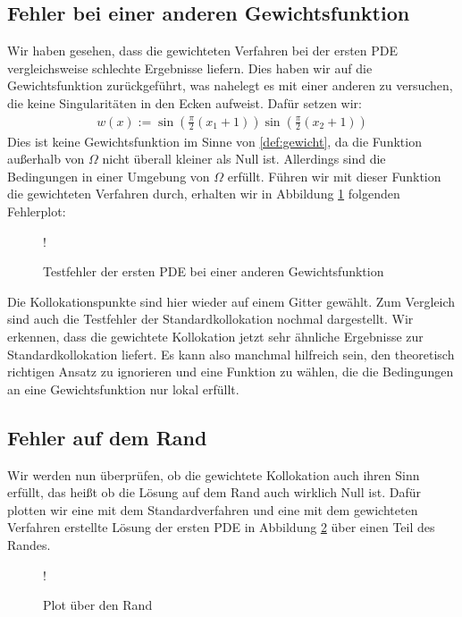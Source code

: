 \subsection{Fehler bei einer anderen Gewichtsfunktion}
\label{sec:andereGewicht}
Wir haben gesehen, dass die gewichteten Verfahren bei der ersten \ac{PDE} vergleichsweise schlechte Ergebnisse liefern. Dies haben wir auf die Gewichtsfunktion zurückgeführt, was nahelegt es mit einer anderen zu versuchen, die keine Singularitäten in den Ecken aufweist. Dafür setzen wir:
\begin{align*}
	w(x) := \sin\left(\frac{\pi}{2}(x_1+1)\right) \sin\left(\frac{\pi}{2}(x_2+1)\right)
\end{align*}
Dies ist keine Gewichtsfunktion im Sinne von \ref{def:gewicht}, da die Funktion außerhalb von $\Omega$ nicht überall kleiner als Null ist. Allerdings sind die Bedingungen in einer Umgebung von $\Omega$ erfüllt. Führen wir mit dieser Funktion die gewichteten Verfahren durch, erhalten wir in Abbildung \ref{fig:andereGewicht} folgenden Fehlerplot:
\begin{figure}[ht]
	\centering
	\resizebox {.85\columnwidth} {!} {
		
	}
	\caption{Testfehler der ersten \acs{PDE} bei einer anderen Gewichtsfunktion}
	\label{fig:andereGewicht}
\end{figure}
Die Kollokationspunkte sind hier wieder auf einem Gitter gewählt. Zum Vergleich sind auch die Testfehler der Standardkollokation nochmal dargestellt. Wir erkennen, dass die gewichtete Kollokation jetzt sehr ähnliche Ergebnisse zur Standardkollokation liefert. Es kann also manchmal hilfreich sein, den theoretisch richtigen Ansatz zu ignorieren und eine Funktion zu wählen, die die Bedingungen an eine Gewichtsfunktion nur lokal erfüllt.

\subsection{Fehler auf dem Rand}
Wir werden nun überprüfen, ob die gewichtete Kollokation auch ihren Sinn erfüllt, das heißt ob die Lösung auf dem Rand auch wirklich Null ist. Dafür plotten wir eine mit dem Standardverfahren und eine mit dem gewichteten Verfahren erstellte Lösung der ersten \ac{PDE} in Abbildung \ref{fig:rand-vergleich} über einen Teil des Randes.

\begin{figure}[ht]
\centering
\resizebox {.85\columnwidth} {!} {

}
\caption{Plot über den Rand}
\label{fig:rand-vergleich}
\end{figure}

